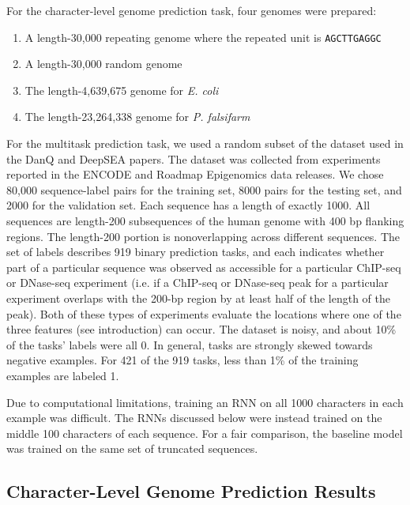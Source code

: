 \documentclass{article} %
\begin{document}
For the character-level genome prediction task, four genomes were prepared:
\begin{enumerate}
	\item A length-30,000 repeating genome where the repeated unit is \texttt{AGCTTGAGGC}
	\item A length-30,000 random genome
	\item The length-4,639,675 genome for \textit{E. coli}
	\item The length-23,264,338 genome for \textit{P. falsifarm}
\end{enumerate}


For the multitask prediction task, we used a random subset of the dataset used in the DanQ \cite{quang2015danq} and DeepSEA \cite{zhou2015predicting} papers. The dataset was collected from experiments reported in the ENCODE \cite{encode2012integrated} and Roadmap Epigenomics \cite{kundaje2015integrative} data releases. We chose 80,000 sequence-label pairs for the training set, 8000 pairs for the testing set, and 2000 for the validation set. Each sequence has a length of exactly 1000. All sequences are length-200 subsequences of the human genome with 400 bp flanking regions. The length-200 portion is nonoverlapping across different sequences. The set of labels describes 919 binary prediction tasks, and each indicates whether part of a particular sequence was observed as accessible for a particular ChIP-seq or DNase-seq experiment (i.e. if a ChIP-seq or DNase-seq peak for a particular experiment overlaps with the 200-bp region by at least half of the length of the peak). Both of these types of experiments evaluate the locations where one of the three features (see introduction) can occur. The dataset is noisy, and about 10\% of the tasks' labels were all 0. In general, tasks are strongly skewed towards negative examples. For 421 of the 919 tasks, less than 1\% of the training examples are labeled 1.

Due to computational limitations, training an RNN on all 1000 characters in each example was difficult. The RNNs discussed below were instead trained on the middle 100 characters of each sequence. For a fair comparison, the baseline model was trained on the same set of truncated sequences. 

\subsection{Character-Level Genome Prediction Results}
\end{document}
